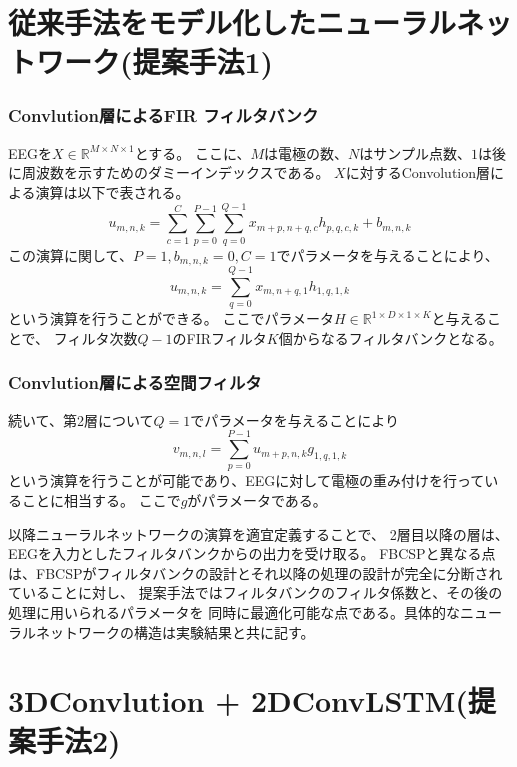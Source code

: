 \section{\mc 従来手法をモデル化したニューラルネットワーク(提案手法1)}
\subsubsection{\rm Convlution\mc 層によるFIR フィルタバンク}
EEGを\(X\in \mathbb R^{M\times N\times 1}\)とする。
ここに、\(M\)は電極の数、\(N\)はサンプル点数、\(1\)は後に周波数を示すためのダミーインデックスである。
\(X\)に対するConvolution層による演算は以下で表される。
\begin{equation}
    u_{m,n,k} = \sum_{c=1}^C\sum_{p=0}^{P-1}\sum_{q=0}^{Q-1} x_{m+p,n+q,c} h_{p,q,c,k} + b_{m,n,k}
\end{equation} 
この演算に関して、\(P=1,b_{m,n,k}=0,C=1\)でパラメータを与えることにより、
\begin{equation}
    u_{m,n,k} = \sum_{q=0}^{Q-1} x_{m,n+q,1} h_{1,q,1,k}
    \label{eq:pseudoFIR}
\end{equation} 
という演算を行うことができる。
ここでパラメータ\(H\in \mathbb R^{1\times D\times 1\times K}\)と与えることで、
フィルタ次数\(Q-1\)のFIRフィルタ\(K\)個からなるフィルタバンクとなる。

\subsubsection{\rm Convlution\mc 層による空間フィルタ}
続いて、第2層について\(Q=1\)でパラメータを与えることにより
\begin{equation}
    v_{m,n,l} = \sum_{p=0}^{P-1} u_{m+p,n,k} g_{1,q,1,k}
    \label{eq:pseudoFIR}
\end{equation} 
という演算を行うことが可能であり、EEGに対して電極の重み付けを行っていることに相当する。
ここで\(g\)がパラメータである。

以降ニューラルネットワークの演算を適宜定義することで、
2層目以降の層は、EEGを入力としたフィルタバンクからの出力を受け取る。
FBCSPと異なる点は、FBCSPがフィルタバンクの設計とそれ以降の処理の設計が完全に分断されていることに対し、
提案手法ではフィルタバンクのフィルタ係数と、その後の処理に用いられるパラメータを
同時に最適化可能な点である。具体的なニューラルネットワークの構造は実験結果と共に記す。


\section{\rm 3DConvlution + 2DConvLSTM\mc (提案手法2)}
